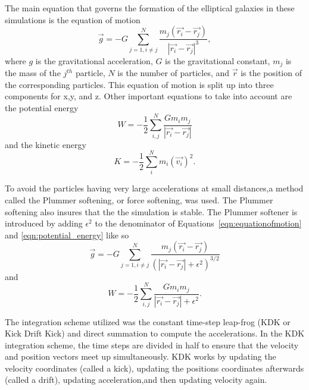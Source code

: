 \documentclass[12pt]{report}
\begin{document}
The main equation that governs the formation of the elliptical galaxies in these simulations is the equation of motion
\begin{equation} \label{eqn:equationofmotion}
    \vec{g} = -G \sum_{j=1, i \neq j}^{N} \frac{m_j \left( \vec{r_i} - \vec{r_j} \right)}{| \vec{r_i} - \vec{r_j} |^3},
\end{equation}
where $g$ is the gravitational acceleration, $G$ is the gravitational constant, $m_{j}$ is the mass of the $j^{th}$ particle, $N$ is the number of particles, and $\vec{r}$ is the position of the corresponding particles. This equation of motion is split up into three components for x,y, and z. Other important equations to take into account are the potential energy
\begin{equation}\label{eqn:potential_energy}
W = - \frac{1}{2} \sum_{i,j}^{N}
\frac{Gm_im_j}{| \vec{r_i} - \vec{r_j} |}    
\end{equation}
and the kinetic energy
\begin{equation}\label{eqn:kineticenergy}
K = - \frac{1}{2} \sum_{i}^N m_i \left( \vec{v_i} \right)^2.
\end{equation}

To avoid the particles having very large accelerations at small distances,a method called the Plummer softening, or force softening, was used. The Plummer softening also insures that the the simulation is stable. The Plummer softener is introduced by adding $\epsilon^2$ to the denominator of Equations~\ref{eqn:equationofmotion} and \ref{eqn:potential_energy} like so
\begin{equation} \label{eqn:plummersofteningeqnofmoiton}
\vec{g} = -G \sum_{j=1, i \neq j}^{N} \frac{m_j \left( \vec{r_i} - \vec{r_j} \right)}{(| \vec{r_i} - \vec{r_j} | + \epsilon^2 )^{3/2}}
\end{equation}
and 
\begin{equation}\label{eqn:potenitalsoftening}
    W = - \frac{1}{2} \sum_{i,j}^{N}
\frac{Gm_im_j}{| \vec{r_i} - \vec{r_j} | + \epsilon^2} .
\end{equation}

The integration scheme utilized was the constant time-step leap-frog (KDK or Kick Drift Kick) and direct summation to compute the accelerations. In the KDK integration scheme, the time steps are divided in half to ensure that the velocity and position vectors meet up simultaneously. KDK works by updating the velocity coordinates (called a kick), updating the positions coordinates afterwards (called a drift), updating acceleration,and then updating velocity again. 
\end{document}
